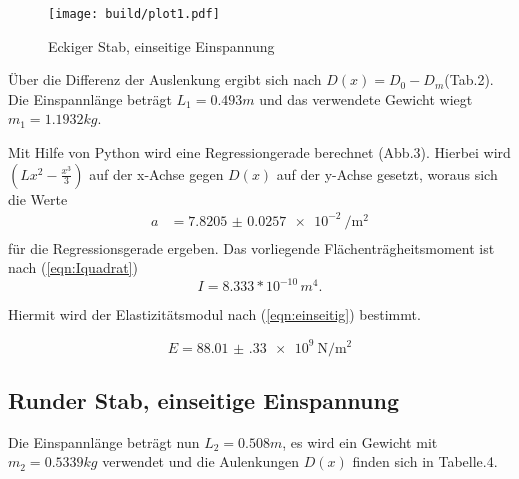 \begin{figure}[h]
  \centering
  \texttt{[image: build/plot1.pdf]}
  \caption{Eckiger Stab, einseitige Einspannung}
  \label{fig:plot1}
\end{figure}

Über die Differenz der Auslenkung  ergibt sich nach
$D(x) = D_0 - D_m$(Tab.2). Die Einspannlänge beträgt $L_1 = 0.493m$ und
das verwendete Gewicht wiegt $m_1 = 1.1932 kg$.





Mit Hilfe von Python wird eine Regressiongerade berechnet (Abb.3).
Hierbei wird $(Lx^2- \frac{x^3}{3})$ auf der x-Achse gegen $D(x)$ auf der y-Achse
gesetzt, woraus sich die Werte
\begin{align*}
  a &= \SI{7.8205(257)e-2}{\per\square\meter} \\
\end{align*}
für die Regressionsgerade ergeben.
\newline
Das vorliegende Flächenträgheitsmoment ist nach (\ref{eqn:Iquadrat})
\begin{equation*}
  I = 8.333 * 10^{-10}\, m^4.
\end{equation*}

Hiermit wird der Elastizitätsmodul nach (\ref{eqn:einseitig}) bestimmt.

\begin{equation*}
  E = \SI{88.01(33)e9}{\newton\per\square\meter}
\end{equation*}
\newpage






\subsection{Runder Stab, einseitige Einspannung}
Die Einspannlänge beträgt nun $L_2 = 0.508m$, es wird ein Gewicht
mit $m_2 = 0.5339 kg $ verwendet und die Aulenkungen $D(x)$ finden
sich in Tabelle.4.

